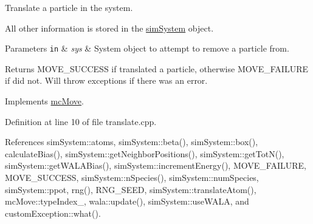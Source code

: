 Translate a particle in the system. 

All other information is stored in the \hyperlink{classsim_system}{sim\+System} object.


\begin{DoxyParams}[1]{Parameters}
\mbox{\tt in}  & {\em sys} & System object to attempt to remove a particle from.\\
\hline
\end{DoxyParams}
\begin{DoxyReturn}{Returns}
M\+O\+V\+E\+\_\+\+S\+U\+C\+C\+E\+S\+S if translated a particle, otherwise M\+O\+V\+E\+\_\+\+F\+A\+I\+L\+U\+R\+E if did not. Will throw exceptions if there was an error. 
\end{DoxyReturn}


Implements \hyperlink{classmc_move_a2e377a628f9ecee5422fc8967d4924eb}{mc\+Move}.



Definition at line 10 of file translate.\+cpp.



References sim\+System\+::atoms, sim\+System\+::beta(), sim\+System\+::box(), calculate\+Bias(), sim\+System\+::get\+Neighbor\+Positions(), sim\+System\+::get\+Tot\+N(), sim\+System\+::get\+W\+A\+L\+A\+Bias(), sim\+System\+::increment\+Energy(), M\+O\+V\+E\+\_\+\+F\+A\+I\+L\+U\+R\+E, M\+O\+V\+E\+\_\+\+S\+U\+C\+C\+E\+S\+S, sim\+System\+::n\+Species(), sim\+System\+::num\+Species, sim\+System\+::ppot, rng(), R\+N\+G\+\_\+\+S\+E\+E\+D, sim\+System\+::translate\+Atom(), mc\+Move\+::type\+Index\+\_\+, wala\+::update(), sim\+System\+::use\+W\+A\+L\+A, and custom\+Exception\+::what().


